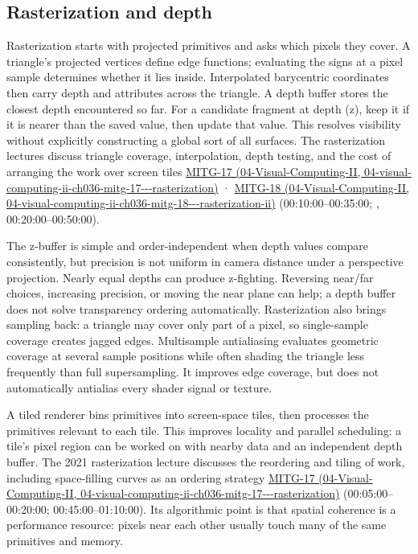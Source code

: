\subsection{Rasterization and depth}\label{03-visual-computing-i-ch015-rasterization-and-depth}

Rasterization starts with projected primitives and asks which pixels they cover. A triangle's projected vertices define edge functions; evaluating the signs at a pixel sample determines whether it lies inside. Interpolated barycentric coordinates then carry depth and attributes across the triangle. A depth buffer stores the closest depth encountered so far. For a candidate fragment at depth (z), keep it if it is nearer than the saved value, then update that value. This resolves visibility without explicitly constructing a global sort of all surfaces. The rasterization lectures discuss triangle coverage, interpolation, depth testing, and the cost of arranging the work over screen tiles \href{../04-Visual-Computing-II/main.pdf\#nameddest=04-visual-computing-ii-ch036-mitg-17---rasterization}{MITG-17 (04-Visual-Computing-II, 04-visual-computing-ii-ch036-mitg-17-\/-\/-rasterization)} · \href{../04-Visual-Computing-II/main.pdf\#nameddest=04-visual-computing-ii-ch036-mitg-18---rasterization-ii}{MITG-18 (04-Visual-Computing-II, 04-visual-computing-ii-ch036-mitg-18-\/-\/-rasterization-ii)} (00:10:00--00:35:00; , 00:20:00--00:50:00).

The z-buffer is simple and order-independent when depth values compare consistently, but precision is not uniform in camera distance under a perspective projection. Nearly equal depths can produce z-fighting. Reversing near/far choices, increasing precision, or moving the near plane can help; a depth buffer does not solve transparency ordering automatically. Rasterization also brings sampling back: a triangle may cover only part of a pixel, so single-sample coverage creates jagged edges. Multisample antialiasing evaluates geometric coverage at several sample positions while often shading the triangle less frequently than full supersampling. It improves edge coverage, but does not automatically antialias every shader signal or texture.

A tiled renderer bins primitives into screen-space tiles, then processes the primitives relevant to each tile. This improves locality and parallel scheduling: a tile's pixel region can be worked on with nearby data and an independent depth buffer. The 2021 rasterization lecture discusses the reordering and tiling of work, including space-filling curves as an ordering strategy \href{../04-Visual-Computing-II/main.pdf\#nameddest=04-visual-computing-ii-ch036-mitg-17---rasterization}{MITG-17 (04-Visual-Computing-II, 04-visual-computing-ii-ch036-mitg-17-\/-\/-rasterization)} (00:05:00--00:20:00; 00:45:00--01:10:00). Its algorithmic point is that spatial coherence is a performance resource: pixels near each other usually touch many of the same primitives and memory.

